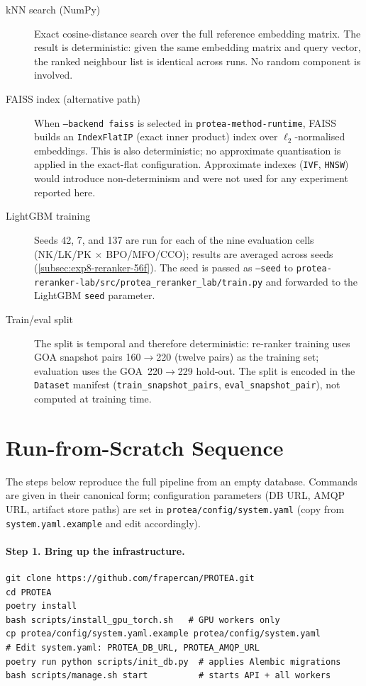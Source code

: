 \begin{description}
  \item[kNN search (NumPy)] Exact cosine-distance search over the
    full reference embedding matrix. The result is deterministic: given
    the same embedding matrix and query vector, the ranked neighbour list
    is identical across runs. No random component is involved.
  \item[FAISS index (alternative path)] When \texttt{--backend faiss}
    is selected in \texttt{protea-method-runtime}, FAISS builds an
    \texttt{IndexFlatIP} (exact inner product) index over
    $\ell_2$-normalised embeddings. This is also deterministic; no
    approximate quantisation is applied in the exact-flat configuration.
    Approximate indexes (\texttt{IVF}, \texttt{HNSW}) would introduce
    non-determinism and were not used for any experiment reported here.
  \item[LightGBM training] Seeds 42, 7, and 137 are run for each of the
    nine evaluation cells (NK/LK/PK $\times$ BPO/MFO/CCO); results are
    averaged across seeds (\cref{subsec:exp8-reranker-56f}). The seed is passed as
    \texttt{--seed} to \texttt{protea-reranker-lab/src/protea\_reranker\_lab/train.py}
    and forwarded to the LightGBM \texttt{seed} parameter.
  \item[Train/eval split] The split is temporal and therefore
    deterministic: re-ranker training uses GOA snapshot pairs 160$\to$220
    (twelve pairs) as the training set; evaluation uses the GOA~220$\to$229
    hold-out. The split is encoded in the \texttt{Dataset} manifest
    (\texttt{train\_snapshot\_pairs}, \texttt{eval\_snapshot\_pair}),
    not computed at training time.
\end{description}

\section{Run-from-Scratch Sequence}
\label{app:repro-steps}

The steps below reproduce the full pipeline from an empty database.
Commands are given in their canonical form; configuration parameters
(DB URL, AMQP URL, artifact store paths) are set in
\texttt{protea/config/system.yaml} (copy from
\texttt{system.yaml.example} and edit accordingly).

\paragraph{Step 1. Bring up the infrastructure.}
\begin{verbatim}
git clone https://github.com/frapercan/PROTEA.git
cd PROTEA
poetry install
bash scripts/install_gpu_torch.sh   # GPU workers only
cp protea/config/system.yaml.example protea/config/system.yaml
# Edit system.yaml: PROTEA_DB_URL, PROTEA_AMQP_URL
poetry run python scripts/init_db.py  # applies Alembic migrations
bash scripts/manage.sh start          # starts API + all workers
\end{verbatim}

